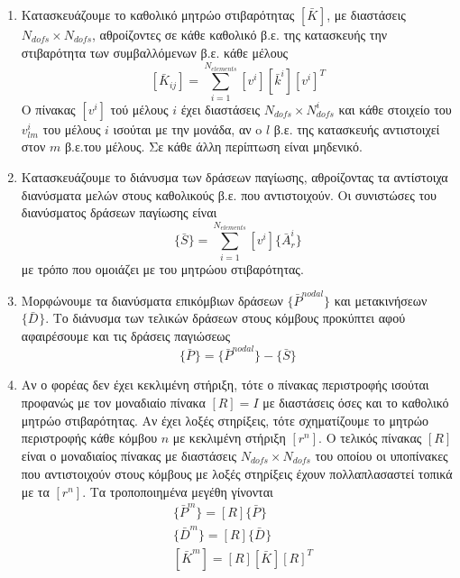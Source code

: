 \documentclass[a4paper, twocolumn]{article}
\newcommand{\num}[1]{ N_{\mathit{#1}} }
\newcommand{\vect}[1]{ \{ #1\} }
\newcommand{\mat}[1]{\left[ #1 \right]}
\newcommand{\gstiff}[1]{\mat{\bar{k}^{\mathit{#1}}}}
\newcommand{\Gstiff}[1]{\mat{\bar{K}^{\mathit{#1}}}}
\newcommand{\gforce}[1]{\vect{\bar{P}^{\mathit{#1}}}}
\newcommand{\gdisp}[1]{\vect{\bar{D}^{\mathit{#1}}}}
\newcommand{\subk}[1]{ \mat{\bar{K}_{\mathit{#1}}} }
\begin{document}
\begin{enumerate}
	\item Kατασκευάζουμε το καθολικό μητρώο στιβαρότητας $\Gstiff{}$, 
	με διαστάσεις $\num{dofs} \times \num{dofs}$,
	 αθροίζοντες σε κάθε καθολικό β.ε. της κατασκευής την στιβαρότητα 
	 των συμβαλλόμενων β.ε. κάθε μέλους
	\begin{equation}
		\subk{ij} = \sum_{i=1}^{\num{elements}} \mat{v^i} \gstiff{i} 
		\mat{v^i}^T
	\end{equation}
	O πίνακας $\mat{v^i}$ τού μέλους $i$ έχει διαστάσεις $\num{dofs} 
	\times \num{dofs}^i$ και κάθε στοιχείο του $v^i_{\mathit{lm}}$ 
	του μέλους $i$ ισούται με την 
	μονάδα, αν o $l$ β.ε. της κατασκευής αντιστοιχεί στον $m$ β.ε.του 
	μέλους. Σε κάθε άλλη περίπτωση είναι μηδενικό.	
	\item Κατασκευάζουμε το διάνυσμα των δράσεων παγίωσης, 
	αθροίζοντας τα αντίστοιχα διανύσματα μελών στους καθολικούς β.ε. 
	που αντιστοιχούν. Οι συνιστώσες του διανύσματος δράσεων παγίωσης 
	είναι
	\begin{equation}
		\vect{\bar S} = \sum_{i=1}^{\num{elements}} \mat{v^i} 
		\vect{\bar{A}_r^i}
	\end{equation}
	με τρόπο που ομοιάζει με του μητρώου στιβαρότητας.
	
	\item Μορφώνουμε τα διανύσματα επικόμβιων δράσεων 
	$\gforce{nodal}$ 
	και μετακινήσεων $\gdisp{}$. Το 
	διάνυσμα των τελικών δράσεων στους κόμβους προκύπτει αφού 
	αφαιρέσουμε και τις δράσεις παγιώσεως
	\begin{equation}
		\gforce{} = \gforce{nodal} - \vect{\bar S}
	\end{equation}
	\item Αν ο φορέας δεν έχει κεκλιμένη στήριξη, τότε ο πίνακας 
	περιστροφής ισούται προφανώς με τον μοναδιαίο πίνακα $\mat{R}=I$ 
	με διαστάσεις όσες και το καθολικό μητρώο στιβαρότητας. Αν έχει 
	λοξές στηρίξεις, τότε σχηματίζουμε το μητρώο περιστροφής 
	κάθε κόμβου $n$ με κεκλιμένη στήριξη $\mat{r^n}$. 
	O τελικός πίνακας $\mat{R}$ είναι ο μοναδιαίος πίνακας με 
	διαστάσεις $\num{dofs} \times \num{dofs}$ του οποίου οι 
	υποπίνακες που αντιστοιχούν στους κόμβους με λοξές στηρίξεις 
	έχουν πολλαπλασαστεί τοπικά με τα $\mat{r^n}$.
	Τα τροποποιημένα μεγέθη γίνονται
	\begin{align}
		&\gforce{m} = \mat{R} \gforce{} \\
		&\gdisp{m} = \mat{R} \gdisp{} \\
		&\Gstiff{m} = \mat{R} \Gstiff{} \mat{R}^T
	\end{align}
	

\end{enumerate}
\end{document}
